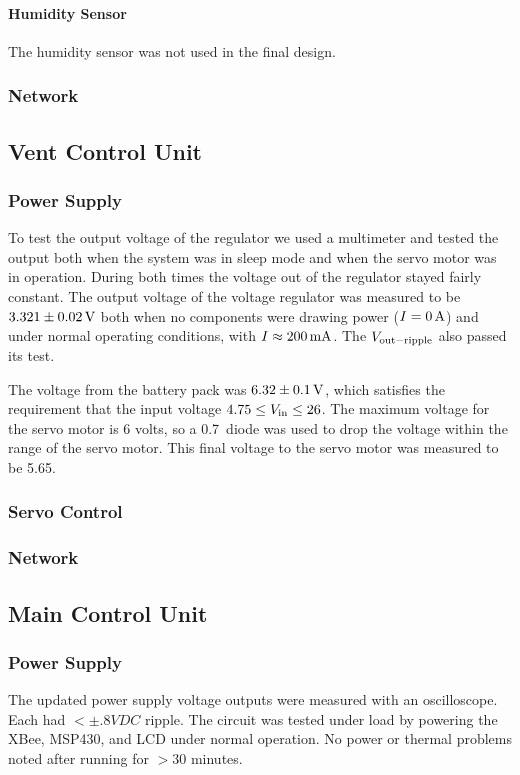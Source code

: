 \paragraph{Humidity Sensor}
The humidity sensor was not used in the final design.

\subsubsection{Network}

\subsection{Vent Control Unit}
\subsubsection{Power Supply}
To test the output voltage of the regulator we used a multimeter and tested the output both when the system was in sleep mode and when the servo motor was in operation. During both times the voltage out of the regulator stayed fairly constant. The output voltage of the voltage regulator was measured to be $3.321 \pm 0.02\mbox{\,V}$ both when no components were drawing power ($I=0\mbox{\,A}$) and under normal operating conditions, with $I\approx200\mbox{\,mA}$. The $V_{\rm out-ripple}$ also passed its test.

The voltage from the battery pack was $6.32 \pm 0.1 \mbox{\,V}$, which satisfies the requirement that the input voltage $4.75 \leq V_{\rm in} \leq 26$. The maximum voltage for the servo motor is 6 volts, so a 0.7\volts\ diode was used to drop the voltage within the range of the servo motor. This final voltage to the servo motor was measured to be 5.65\volts .

\subsubsection{Servo Control}

\subsubsection{Network}

\subsection{Main Control Unit}

\subsubsection{Power Supply}
The updated power supply voltage outputs were measured with an oscilloscope.  Each had $<\pm .8VDC$ ripple.  The circuit was tested under load by powering the XBee, MSP430, and LCD under normal operation. No power or thermal problems noted after running for $>30$ minutes.

